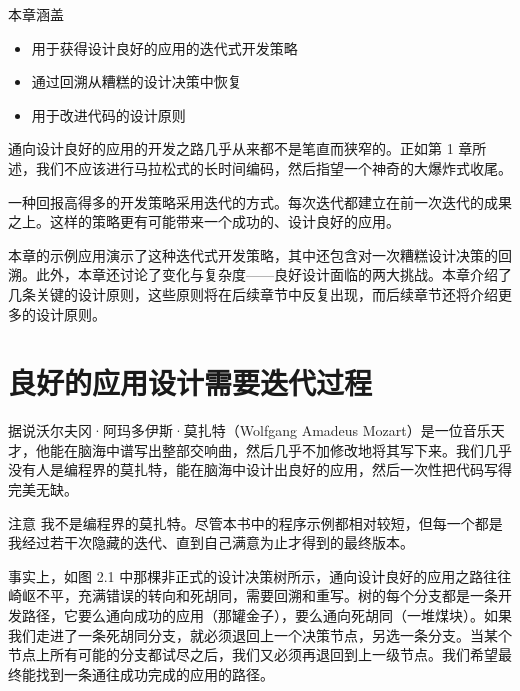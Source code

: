 \begin{myChapterIntro}{本章涵盖}
\begin{itemize}
\item 用于获得设计良好的应用的迭代式开发策略
\item 通过回溯从糟糕的设计决策中恢复
\item 用于改进代码的设计原则
\end{itemize}
\end{myChapterIntro}

通向设计良好的应用的开发之路几乎从来都不是笔直而狭窄的。正如第 1 章所述，我们不应该进行马拉松式的长时间编码，然后指望一个神奇的大爆炸式收尾。

一种回报高得多的开发策略采用迭代的方式。每次迭代都建立在前一次迭代的成果之上。这样的策略更有可能带来一个成功的、设计良好的应用。


本章的示例应用演示了这种迭代式开发策略，其中还包含对一次糟糕设计决策的回溯。此外，本章还讨论了变化与复杂度——良好设计面临的两大挑战。本章介绍了几条关键的设计原则，这些原则将在后续章节中反复出现，而后续章节还将介绍更多的设计原则。

\section{良好的应用设计需要迭代过程}

据说沃尔夫冈·阿玛多伊斯·莫扎特（Wolfgang Amadeus Mozart）是一位音乐天才，他能在脑海中谱写出整部交响曲，然后几乎不加修改地将其写下来。我们几乎没有人是编程界的莫扎特，能在脑海中设计出良好的应用，然后一次性把代码写得完美无缺。

\begin{myWarning}{注意}
我不是编程界的莫扎特。尽管本书中的程序示例都相对较短，但每一个都是我经过若干次隐藏的迭代、直到自己满意为止才得到的最终版本。
\end{myWarning}

事实上，如图 2.1 中那棵非正式的设计决策树所示，通向设计良好的应用之路往往崎岖不平，充满错误的转向和死胡同，需要回溯和重写。树的每个分支都是一条开发路径，它要么通向成功的应用（那罐金子），要么通向死胡同（一堆煤块）。如果我们走进了一条死胡同分支，就必须退回上一个决策节点，另选一条分支。当某个节点上所有可能的分支都试尽之后，我们又必须再退回到上一级节点。我们希望最终能找到一条通往成功完成的应用的路径。


